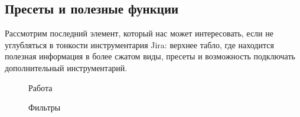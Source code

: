\documentclass[12pt, a4paper]{article}
\begin{document}
    \subsection{Пресеты и полезные функции}
    Рассмотрим последний элемент, который нас может интересовать, если не углубляться в тонкости 
    инструментария Jira: верхнее табло, где находится полезная информация в более сжатом виды,
     пресеты и возможность подключать дополнительный инструментарий.
    
    \begin{multicols}{2}[]
        \begin{figure}[H]
            \caption{Работа}
        \end{figure}
        \columnbreak
        \begin{figure}[H]
            \caption{Фильтры}
        \end{figure}
    \end{multicols}
\end{document}
